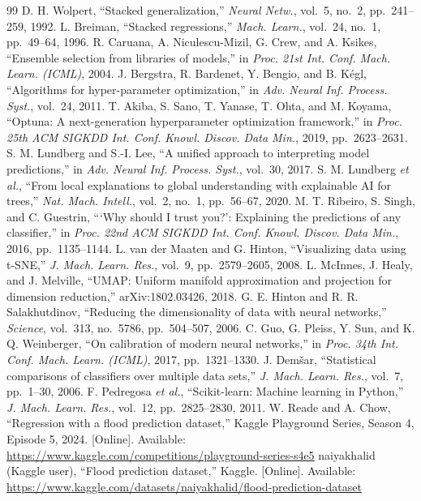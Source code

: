 \documentclass[conference]{IEEEtran}
\begin{document}
\begin{thebibliography}{99}
 D. H. Wolpert, ``Stacked generalization,'' \emph{Neural Netw.}, vol.~5, no.~2, pp.~241--259, 1992.
 L. Breiman, ``Stacked regressions,'' \emph{Mach. Learn.}, vol.~24, no.~1, pp.~49--64, 1996.
 R. Caruana, A. Niculescu-Mizil, G. Crew, and A. Ksikes, ``Ensemble selection from libraries of models,'' in \emph{Proc. 21st Int. Conf. Mach. Learn. (ICML)}, 2004.
 J. Bergstra, R. Bardenet, Y. Bengio, and B. K\'egl, ``Algorithms for hyper-parameter optimization,'' in \emph{Adv. Neural Inf. Process. Syst.}, vol.~24, 2011.
 T. Akiba, S. Sano, T. Yanase, T. Ohta, and M. Koyama, ``Optuna: A next-generation hyperparameter optimization framework,'' in \emph{Proc. 25th ACM SIGKDD Int. Conf. Knowl. Discov. Data Min.}, 2019, pp.~2623--2631.
 S. M. Lundberg and S.-I. Lee, ``A unified approach to interpreting model predictions,'' in \emph{Adv. Neural Inf. Process. Syst.}, vol.~30, 2017.
 S. M. Lundberg \emph{et al.}, ``From local explanations to global understanding with explainable AI for trees,'' \emph{Nat. Mach. Intell.}, vol.~2, no.~1, pp.~56--67, 2020.
 M. T. Ribeiro, S. Singh, and C. Guestrin, ```Why should I trust you?': Explaining the predictions of any classifier,'' in \emph{Proc. 22nd ACM SIGKDD Int. Conf. Knowl. Discov. Data Min.}, 2016, pp.~1135--1144.
 L. van der Maaten and G. Hinton, ``Visualizing data using t-SNE,'' \emph{J. Mach. Learn. Res.}, vol.~9, pp.~2579--2605, 2008.
 L. McInnes, J. Healy, and J. Melville, ``UMAP: Uniform manifold approximation and projection for dimension reduction,'' arXiv:1802.03426, 2018.
 G. E. Hinton and R. R. Salakhutdinov, ``Reducing the dimensionality of data with neural networks,'' \emph{Science}, vol.~313, no.~5786, pp.~504--507, 2006.
 C. Guo, G. Pleiss, Y. Sun, and K. Q. Weinberger, ``On calibration of modern neural networks,'' in \emph{Proc. 34th Int. Conf. Mach. Learn. (ICML)}, 2017, pp.~1321--1330.
 J. Dem\v{s}ar, ``Statistical comparisons of classifiers over multiple data sets,'' \emph{J. Mach. Learn. Res.}, vol.~7, pp.~1--30, 2006.
 F. Pedregosa \emph{et al.}, ``Scikit-learn: Machine learning in Python,'' \emph{J. Mach. Learn. Res.}, vol.~12, pp.~2825--2830, 2011.
 W. Reade and A. Chow, ``Regression with a flood prediction dataset,'' Kaggle Playground Series, Season 4, Episode 5, 2024. [Online]. Available: \url{https://www.kaggle.com/competitions/playground-series-s4e5}
 naiyakhalid (Kaggle user), ``Flood prediction dataset,'' Kaggle. [Online]. Available: \url{https://www.kaggle.com/datasets/naiyakhalid/flood-prediction-dataset}
\end{thebibliography}
\end{document}
